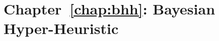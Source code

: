 \section{Chapter~\ref{chap:bhh}: Bayesian Hyper-Heuristic}
\label{sec:symbols:bhh}

\begin{description}
	\item [\parbox{2cm}{$\alpha_{1}$}]
	\item [\parbox{2cm}{$\alpha_{k}$}]
	\item [\parbox{2cm}{$\alpha_{K}$}]
	\item [\parbox{2cm}{$\alpha$}]
	\item [\parbox{2cm}{$\beta_{1}$}]
	\item [\parbox{2cm}{$\beta_{2}$}]
	\item [\parbox{2cm}{$\beta_{j,k}$}]
	\item [\parbox{2cm}{$\beta_{K}^{J}$}]
	\item [\parbox{2cm}{$\beta$}]
	\item [\parbox{2cm}{$\boldsymbol{\alpha}$}]
	\item [\parbox{2cm}{$\boldsymbol{\beta}$}]
	\item [\parbox{2cm}{$\boldsymbol{\gamma}$}]
	\item [\parbox{2cm}{$\boldsymbol{\hat{\phi}}$}]
	\item [\parbox{2cm}{$\boldsymbol{\hat{\psi}}$}]
	\item [\parbox{2cm}{$\boldsymbol{\hat{\theta}}$}]
	\item [\parbox{2cm}{$\boldsymbol{\lambda}$}]
	\item [\parbox{2cm}{$\boldsymbol{\phi}$}]
	\item [\parbox{2cm}{$\boldsymbol{\psi}$}]
	\item [\parbox{2cm}{$\boldsymbol{\theta}$}]
	\item [\parbox{2cm}{$\boldsymbol{C}$}]
	\item [\parbox{2cm}{$\boldsymbol{E}$}]
	\item [\parbox{2cm}{$\boldsymbol{H}$}]
	\item [\parbox{2cm}{$\epsilon(-1)$}]
	\item [\parbox{2cm}{$\epsilon$}]
	\item [\parbox{2cm}{$\eta$}]
	\item [\parbox{2cm}{$\gamma_{0}$}]
	\item [\parbox{2cm}{$\gamma_{1,k}$}]
	\item [\parbox{2cm}{$\gamma_{1}$}]
	\item [\parbox{2cm}{$\gamma_{2,k}$}]

\end{description}
